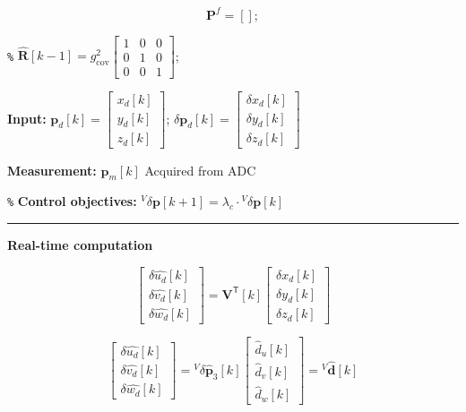 \documentclass[UTF8,11pt,a4paper]{ctexart}
\newcommand{\tp}{^{\!\mathsf{T}}}
\newcommand{\VkT}{\mathbf{V}\tp\![k]}
\newcommand{\lc}{\lambda_c}
\newcommand{\dhat}[1]{\hat{d}_{#1}[k]}          %
\newcommand{\Vdhat}{{}^V\!\hat{\mathbf{d}}}
\begin{document}
\[
\mathbf{P}^f = [ ];
\]

\noindent\texttt{\%} $\hat{\mathbf{R}}[k\!-\!1] = g_{\mathrm{cov}}^2
\begin{bmatrix}1&0&0\\0&1&0\\0&0&1\end{bmatrix}$;

\bigskip

\noindent\textbf{Input:}\;
$\mathbf{p}_d[k]=\begin{bmatrix}x_d[k]\\y_d[k]\\z_d[k]\end{bmatrix}$\;;\quad
$\delta\mathbf{p}_d[k]=\begin{bmatrix}\delta x_d[k]\\\delta y_d[k]\\\delta z_d[k]\end{bmatrix}$

\medskip
\noindent\textbf{Measurement:}\; $\mathbf{p}_m[k]$ \;Acquired from ADC

\medskip
\noindent\texttt{\%} \textbf{Control objectives:}\;
${}^V\!\delta\mathbf{p}[k\!+\!1] = \lc\cdot{}^V\!\delta\mathbf{p}[k]$

\bigskip
\noindent\rule{\textwidth}{0.4pt}
\medskip
\noindent\textbf{Real-time computation}
\medskip

\[
\begin{bmatrix}\delta \hat{u_d}[k]\\\delta \hat{v_d}[k]\\\delta\hat{w_d}[k]\end{bmatrix}
= \VkT \begin{bmatrix}\delta x_d[k]\\\delta y_d[k]\\\delta z_d[k]\end{bmatrix}
\]

\[
\begin{bmatrix}\delta \hat{u_d}[k]\\\delta \hat{v_d}[k]\\\delta\hat{w_d}[k]\end{bmatrix}
= {}^V\!\delta\hat{\mathbf{p}}_3[k]
\begin{bmatrix}\dhat{u}\\\dhat{v}\\\dhat{w}\end{bmatrix}
= \Vdhat[k]
\]
\end{document}
